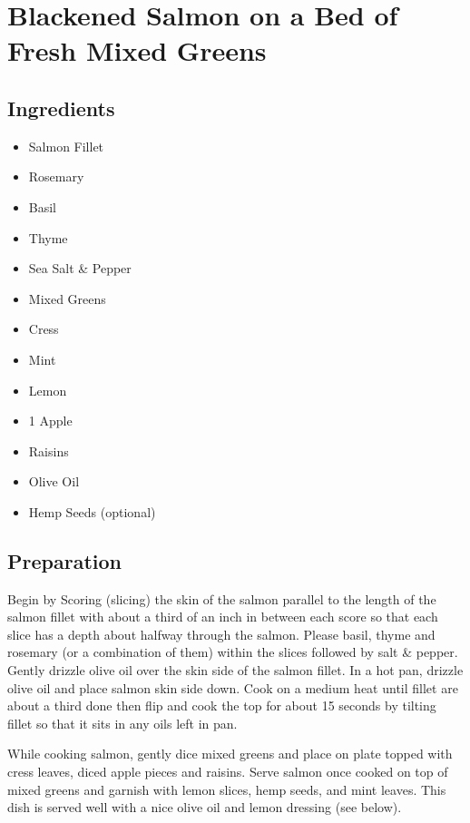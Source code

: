 \thispagestyle{fancy}
\section{Blackened Salmon on a Bed of Fresh Mixed Greens}
\AddToShipoutPicture*{\SalmonSalad}

\subsection*{Ingredients}
\begin{multicols}{3}
	\begin{itemize}
		\item Salmon Fillet
		\item Rosemary
		\item Basil
		\item Thyme
		\item Sea Salt \& Pepper
		\item Mixed Greens
		\item Cress
		\item Mint
		\item Lemon
		\item 1 Apple
		\item Raisins
		\item Olive Oil
		\item Hemp Seeds (optional) 
	\end{itemize}
\end{multicols}

\subsection*{Preparation}

Begin by Scoring (slicing) the skin of the salmon parallel to the length of the salmon fillet with about a third of an inch in between each score so that each slice has a depth about halfway through the salmon. Please basil, thyme and rosemary (or a combination of them) within the slices followed by salt \& pepper. Gently drizzle olive oil over the skin side of the salmon fillet. In a hot pan, drizzle olive oil and place salmon skin side down. Cook on a medium heat until fillet are about a third done then flip and cook the top for about 15 seconds by tilting fillet so that it sits in any oils left in pan.

While cooking salmon, gently dice mixed greens and place on plate topped with cress leaves, diced apple pieces and raisins. Serve salmon once cooked on top of mixed greens and garnish with lemon slices, hemp seeds, and mint leaves. This dish is served well with a nice olive oil and lemon dressing (see below).

